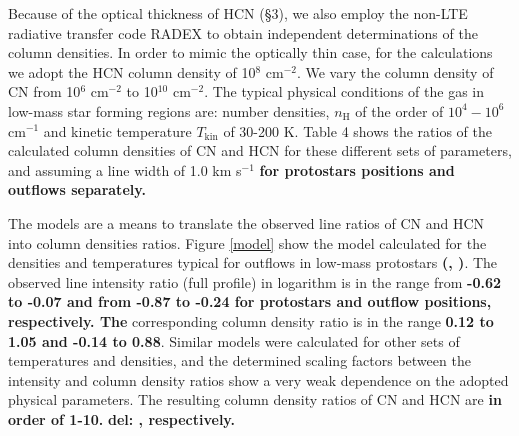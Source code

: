 \documentclass{aa}
\begin{document}
Because of the optical thickness of HCN (\S 3), we also employ the non-LTE radiative transfer code RADEX 
to obtain independent determinations of the column densities. In order to mimic the optically thin case,
for the calculations we adopt the HCN column density of 10$^8$ cm$^{-2}$. We vary the column density 
of CN from 10$^6$ cm$^{-2}$ to 10$^{10}$ cm$^{-2}$. The typical physical conditions of the gas 
in low-mass star forming regions are: number densities, $n_\mathrm{H}$ of the order of \textbf{$10^{4}-10^{6}$} cm$^{-1}$ 
and kinetic temperature $T_\mathrm{kin}$ of 30-200 K. Table 4 shows the ratios of the calculated 
column densities of CN and HCN for these different sets of parameters, and assuming a line width of 1.0 km s$^{-1}$
\textbf{for protostars positions and outflows separately.}

The models are a means to translate the observed line ratios of CN and HCN into column densities ratios. 
Figure \ref{model} show the model calculated for the densities and temperatures typical for 
outflows in low-mass protostars \textbf{(\citealt{vK09}, \citealt{Dio13})}. The observed line intensity ratio (full profile) 
in logarithm is in the range from \textbf{-0.62 to -0.07 and from -0.87 to -0.24 for protostars and outflow positions, respectively. The} corresponding column density ratio is
in the range \textbf{0.12 to 1.05 and -0.14 to 0.88}. Similar models were calculated for other sets of 
temperatures and densities, and the determined scaling factors between the intensity and column
density ratios show a very weak dependence on the adopted physical parameters. The resulting 
column density ratios of CN and HCN are \textbf{in order of 1-10.} \textbf{ del: , respectively.}

\end{document}
